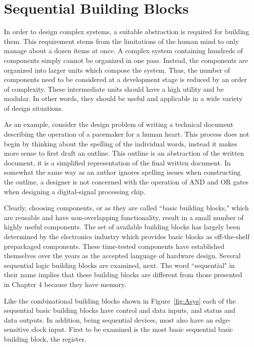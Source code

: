 \chapter{Sequential Building Blocks}

In order to design complex systems, a suitable 
abstraction is required for building them.  This requirement stems from the
limitations of the human mind to only manage about a dozen items
at once.  A complex system containing hundreds of components
simply cannot be organized in one pass.  Instead, the components 
are organized into larger units which compose the system. Thus, 
the number of components need to be considered at a development stage is reduced
by an order of complexity. These intermediate units should have
a high utility and be modular.  In other words, they should be
useful and applicable in a wide variety of design situations.

As an example, consider the design problem of writing a technical 
document describing the operation of a pacemaker for a human heart.
This process does not begin by thinking about the spelling of
the individual words, instead it makes more sense to first
draft an outline.  This outline is an abstraction of the 
written document, it is a simplified representation of the final 
written document.  In somewhat the same way as an author ignores
spelling issues when constructing the outline, a designer is not concerned with 
the operation of AND and OR gates
when designing a digital-signal processing chip.  

Clearly, choosing components, or as they are called ``basic 
building blocks," which are reusable and have non-overlapping
functionality, result in a small number of highly useful 
components.  The set of available building blocks has largely 
been determined by the electronics industry which provides basic
blocks as off-the-shelf prepackaged components.  These 
time-tested components have established themselves over the years 
as the accepted language of hardware design. 
Several sequential logic building blocks are examined, next.  
The word ``sequential" in their name implies that these building 
blocks are different from those presented in Chapter 4 because 
they have memory. 

Like the combinational building blocks shown in 
Figure~\ref{fig:Asys} each of the sequential basic building 
blocks have control and data inputs, and status and
data outputs.  In addition, being sequential devices, most
also have an edge-sensitive clock input.  First to be examined is 
the most basic sequential basic building block, the register.

